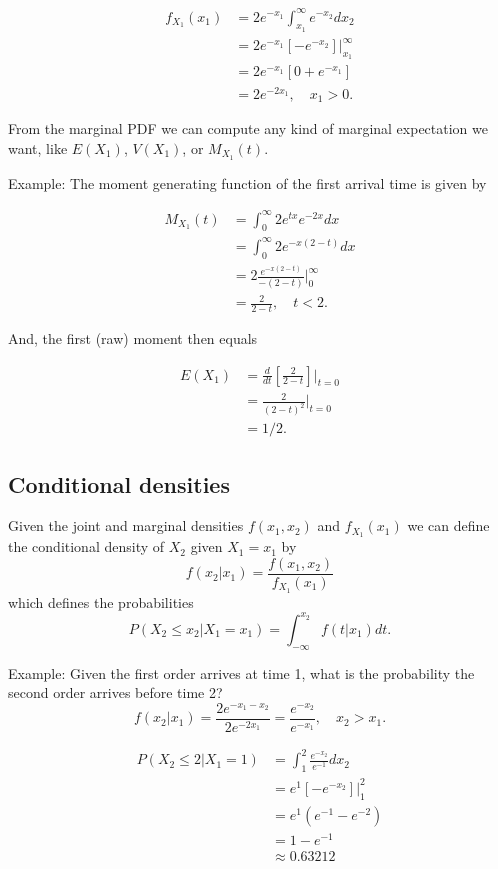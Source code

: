 \documentclass[]{book}
\begin{document}
\begin{align*}
f_{X_1}(x_1) &=  2e^{-x_1}\int_{x_1}^{\infty}e^{-x_2}dx_2\\
& = 2e^{-x_1}[-e^{-x_2}]|_{x_1}^\infty\\
& = 2e^{-x_1}[0 + e^{-x_1}]\\
& = 2e^{-2x_1}, \quad x_1>0.
\end{align*}

 From the marginal PDF we can compute any kind of marginal expectation
we want, like \(E(X_1)\), \(V(X_1)\), or \(M_{X_1}(t)\).

 Example: The moment generating function of the first arrival time is
given by

\begin{align*}
M_{X_1}(t) &= \int_{0}^\infty 2e^{tx}e^{-2x}dx\\
& = \int_{0}^\infty 2e^{-x(2-t)}dx \\
& = 2\frac{e^{-x(2-t)}}{-(2-t)}|_{0}^\infty\\
& = \frac{2}{2-t}, \quad t<2.
\end{align*}

And, the first (raw) moment then equals

\begin{align*}
E(X_1) &= \frac{d}{dt}[\frac{2}{2-t}]|_{t=0}\\
&= \frac{2}{(2-t)^2}|_{t=0}\\
& = 1/2.
\end{align*}

\subsection{Conditional densities}\label{conditional-densities}

Given the joint and marginal densities \(f(x_1, x_2)\) and
\(f_{X_1}(x_1)\) we can define the conditional density of \(X_2\) given
\(X_1=x_1\) by \[f(x_2|x_1) = \frac{f(x_1, x_2)}{f_{X_1}(x_1)}\] which
defines the probabilities
\[P(X_2\leq x_2|X_1=x_1) = \int_{-\infty}^{x_2} f(t|x_1)dt.\]

Example: Given the first order arrives at time 1, what is the
probability the second order arrives before time 2?
\[f(x_2|x_1) = \frac{2e^{-x_1-x_2}}{2e^{-2x_1}} = \frac{e^{-x_2}}{e^{-x_1}}, \quad x_2>x_1.\]

\begin{align*}
P(X_2\leq 2|X_1=1) &= \int_{1}^2 \frac{e^{-x_2}}{e^{-1}}dx_2\\
&= e^{1}[-e^{-x_2}]|_1^2\\
& = e^{1}(e^{-1}-e^{-2})\\
& = 1-e^{-1}\\
& \approx 0.63212
\end{align*}
\end{document}
